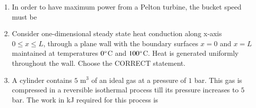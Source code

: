 \documentclass[journal]{IEEEtran}
\begin{document}
\begin{enumerate}[leftmargin=0pt]
\item In order to have maximum power from a Pelton turbine, the bucket speed must be 
\begin{enumerate}
\end{enumerate}
\hfill{}

\item Consider one-dimensional steady state heat conduction along x-axis $0 \leq x \leq L$, through a plane wall with the boundary surfaces $x=0$ and $x=L$ maintained at temperatures $0\degree$C and $100\degree$C. Heat is generated uniformly throughout the wall. Choose the CORRECT statement.
\begin{enumerate}
\end{enumerate}
\hfill{}

\item A cylinder contains $5$ m$^3$ of an ideal gas at a pressure of $1$ bar. This gas is compressed in a reversible isothermal process till its pressure increases to $5$ bar. The work in kJ required for this process is
\begin{enumerate}
\end{enumerate}
\hfill{}


\end{enumerate}
\end{document}
